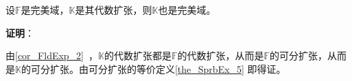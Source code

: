 \begin{corollary}{}\label{cor_SprbEx_5}
设$\mathbb{F}$是完美域，$\mathbb{K}$是其代数扩张，则$\mathbb{K}$也是完美域。
\end{corollary}


\textbf{证明}：















由\autoref{cor_FldExp_2}~，$\mathbb{K}$的代数扩张都是$\mathbb{F}$的代数扩张，从而是$\mathbb{F}$的可分扩张，从而是$\mathbb{K}$的可分扩张。由可分扩张的等价定义\autoref{the_SprbEx_5} 即得证。


